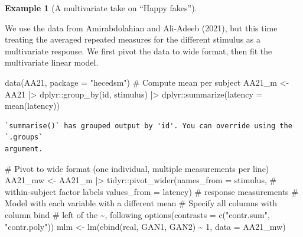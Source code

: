\documentclass[
  11pt,
  letterpaper,
]{scrbook}
\newenvironment{Shaded}{\begin{snugshade}}{\end{snugshade}}
\newcommand{\AttributeTok}[1]{\textcolor[rgb]{0.40,0.45,0.13}{#1}}
\newcommand{\CommentTok}[1]{\textcolor[rgb]{0.37,0.37,0.37}{#1}}
\newcommand{\DecValTok}[1]{\textcolor[rgb]{0.68,0.00,0.00}{#1}}
\newcommand{\FunctionTok}[1]{\textcolor[rgb]{0.28,0.35,0.67}{#1}}
\newcommand{\NormalTok}[1]{\textcolor[rgb]{0.00,0.23,0.31}{#1}}
\newcommand{\OtherTok}[1]{\textcolor[rgb]{0.00,0.23,0.31}{#1}}
\newcommand{\SpecialCharTok}[1]{\textcolor[rgb]{0.37,0.37,0.37}{#1}}
\newcommand{\StringTok}[1]{\textcolor[rgb]{0.13,0.47,0.30}{#1}}
\theoremstyle{definition}
\theoremstyle{definition}
\newtheorem{example}{Example}[chapter]
\theoremstyle{remark}
\begin{document}
\begin{example}[A multivariate take on ``Happy
fakes'']\protect\hypertarget{exm-happyfakemulti}{}\label{exm-happyfakemulti}

We use the data from Amirabdolahian and Ali-Adeeb (2021), but this time
treating the averaged repeated measures for the different stimulus as a
multivariate response. We first pivot the data to wide format, then fit
the multivariate linear model.

\begin{Shaded}
\begin{Highlighting}[]
\FunctionTok{data}\NormalTok{(AA21, }\AttributeTok{package =} \StringTok{"hecedsm"}\NormalTok{)}
\CommentTok{\# Compute mean per subject}
\NormalTok{AA21\_m }\OtherTok{\textless{}{-}}\NormalTok{ AA21 }\SpecialCharTok{|\textgreater{}}
\NormalTok{  dplyr}\SpecialCharTok{::}\FunctionTok{group\_by}\NormalTok{(id, stimulus) }\SpecialCharTok{|\textgreater{}}
\NormalTok{  dplyr}\SpecialCharTok{::}\FunctionTok{summarize}\NormalTok{(}\AttributeTok{latency =} \FunctionTok{mean}\NormalTok{(latency))}
\end{Highlighting}
\end{Shaded}

\begin{verbatim}
`summarise()` has grouped output by 'id'. You can override using the `.groups`
argument.
\end{verbatim}

\begin{Shaded}
\begin{Highlighting}[]
\CommentTok{\# Pivot to wide format (one individual, multiple measurements per line)}
\NormalTok{AA21\_mw }\OtherTok{\textless{}{-}}\NormalTok{ AA21\_m }\SpecialCharTok{|\textgreater{}}
\NormalTok{  tidyr}\SpecialCharTok{::}\FunctionTok{pivot\_wider}\NormalTok{(}\AttributeTok{names\_from =}\NormalTok{ stimulus, }\CommentTok{\# within{-}subject factor labels}
                     \AttributeTok{values\_from =}\NormalTok{ latency) }\CommentTok{\# response measurements }
\CommentTok{\# Model with each variable with a different mean}
\CommentTok{\# Specify all columns with column bind }
\CommentTok{\# left of the \textasciitilde{}, following }
\FunctionTok{options}\NormalTok{(}\AttributeTok{contrasts =} \FunctionTok{c}\NormalTok{(}\StringTok{"contr.sum"}\NormalTok{, }\StringTok{"contr.poly"}\NormalTok{))}
\NormalTok{mlm }\OtherTok{\textless{}{-}} \FunctionTok{lm}\NormalTok{(}\FunctionTok{cbind}\NormalTok{(real, GAN1, GAN2) }\SpecialCharTok{\textasciitilde{}} \DecValTok{1}\NormalTok{,}
          \AttributeTok{data =}\NormalTok{ AA21\_mw)}
\end{Highlighting}
\end{Shaded}


\end{example}
\end{document}
